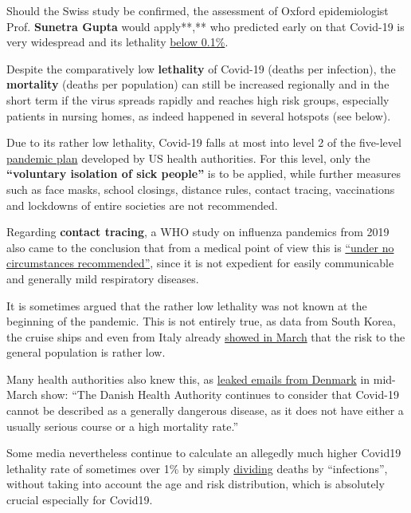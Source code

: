 Should the Swiss study be confirmed, the assessment of Oxford
epidemiologist Prof. \textbf{Sunetra Gupta} would apply**,** who
predicted early on that Covid-19 is very widespread and its lethality
\href{https://unherd.com/2020/05/oxford-doubles-down-sunetra-gupta-interview/}{below
0.1\%}.

Despite the comparatively low \textbf{lethality} of Covid-19 (deaths per
infection), the \textbf{mortality} (deaths per population) can still be
increased regionally and in the short term if the virus spreads rapidly
and reaches high risk groups, especially patients in nursing homes, as
indeed happened in several hotspots (see below).

Due to its rather low lethality, Covid-19 falls at most into level 2 of
the five-level
\href{https://www.cidrap.umn.edu/news-perspective/2007/02/hhs-ties-pandemic-mitigation-advice-severity}{pandemic
plan} developed by US health authorities. For this level, only the
\textbf{``voluntary isolation of sick people''} is to be applied, while
further measures such as face masks, school closings, distance rules,
contact tracing, vaccinations and lockdowns of entire societies are not
recommended.

Regarding \textbf{contact tracing}, a WHO study on influenza pandemics
from 2019 also came to the conclusion that from a medical point of view
this is
\href{https://apps.who.int/iris/bitstream/handle/10665/329438/9789241516839-eng.pdf}{``under
no circumstances recommended''}, since it is not expedient for easily
communicable and generally mild respiratory diseases.

It is sometimes argued that the rather low lethality was not known at
the beginning of the pandemic. This is not entirely true, as data from
South Korea, the cruise ships and even from Italy already
\href{https://www.statnews.com/2020/03/17/a-fiasco-in-the-making-as-the-coronavirus-pandemic-takes-hold-we-are-making-decisions-without-reliable-data/}{showed
in March} that the risk to the general population is rather low.

Many health authorities also knew this, as
\href{https://www.thelocal.dk/20200529/leaked-emails-show-how-denmarks-pm-steam-rollered-her-own-health-agency}{leaked
emails from Denmark} in mid-March show: ``The Danish Health Authority
continues to consider that Covid-19 cannot be described as a generally
dangerous disease, as it does not have either a usually serious course
or a high mortality rate.''

Some media nevertheless continue to calculate an allegedly much higher
Covid19 lethality rate of sometimes over 1\% by simply
\href{https://english.elpais.com/society/2020-05-14/antibody-study-shows-just-5-of-spaniards-have-contracted-the-coronavirus.html}{dividing}
deaths by ``infections'', without taking into account the age and risk
distribution, which is absolutely crucial especially for Covid19.

